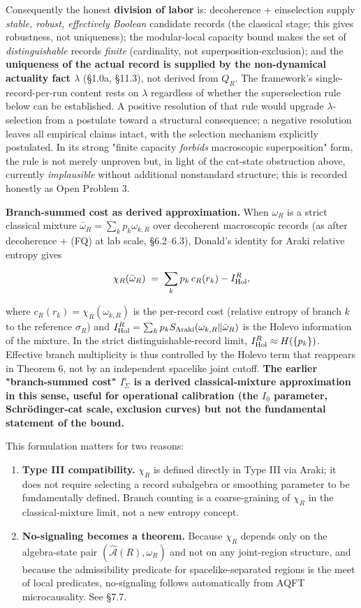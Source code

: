 \documentclass[11pt,a4paper]{article}
\begin{document}
Consequently the honest \textbf{division of labor} is: decoherence + einselection supply \emph{stable, robust, effectively Boolean} candidate records (the classical stage; this gives robustness, not uniqueness); the modular-local capacity bound makes the set of \emph{distinguishable} records \emph{finite} (cardinality, not superposition-exclusion); and the \textbf{uniqueness of the actual record is supplied by the non-dynamical actuality fact $\lambda$} (§1.0a, §11.3), not derived from $Q_R$. The framework's single-record-per-run content rests on $\lambda$ regardless of whether the superselection rule below can be established. A positive resolution of that rule would upgrade $\lambda$-selection from a postulate toward a structural consequence; a negative resolution leaves all empirical claims intact, with the selection mechanism explicitly postulated. In its strong "finite capacity \emph{forbids} macroscopic superposition" form, the rule is not merely unproven but, in light of the cat-state obstruction above, currently \emph{implausible} without additional nonstandard structure; this is recorded honestly as Open Problem 3.

\textbf{Branch-summed cost as derived approximation.} When $\omega_R$ is a strict classical mixture $\bar\omega_R = \sum_k p_k \omega_{k,R}$ over decoherent macroscopic records (as after decoherence + (FQ) at lab scale, §6.2–6.3), Donald's identity for Araki relative entropy gives

\[
\chi_R(\bar\omega_R) \;=\; \sum_k p_k \, c_R(r_k) - I_{\rm Hol}^R,
\]

where $c_R(r_k) = \chi_R(\omega_{k,R})$ is the per-record cost (relative entropy of branch $k$ to the reference $\sigma_R$) and $I_{\rm Hol}^R = \sum_k p_k S_{\rm Araki}(\omega_{k,R} \| \bar\omega_R)$ is the Holevo information of the mixture. In the strict distinguishable-record limit, $I_{\rm Hol}^R \approx H(\{p_k\})$. Effective branch multiplicity is thus controlled by the Holevo term that reappears in Theorem 6, not by an independent spacelike joint cutoff. \textbf{The earlier "branch-summed cost" $I_\Sigma^\epsilon$ is a derived classical-mixture approximation in this sense, useful for operational calibration (the $I_0$ parameter, Schrödinger-cat scale, exclusion curves) but not the fundamental statement of the bound.}

This formulation matters for two reasons:

\begin{enumerate}
  \item \textbf{Type III compatibility.} $\chi_R$ is defined directly in Type III via Araki; it does not require selecting a record subalgebra or smoothing parameter to be fundamentally defined. Branch counting is a coarse-graining of $\chi_R$ in the classical-mixture limit, not a new entropy concept.
  \item \textbf{No-signaling becomes a theorem.} Because $\chi_R$ depends only on the algebra-state pair $(\hat{\mathcal{A}}(R), \omega_R)$ and not on any joint-region structure, and because the admissibility predicate for spacelike-separated regions is the meet of local predicates, no-signaling follows automatically from AQFT microcausality. See §7.7.
\end{enumerate}
\end{document}
